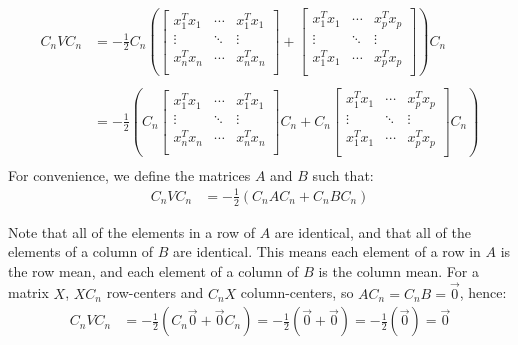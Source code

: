 \documentclass[a4paper]{article}
\begin{document}
\begin{align*}
  C_nVC_n &=-\frac{1}{2} C_n\left(
    \begin{bmatrix}
      x_1^Tx_1 & \cdots & x_1^Tx_1 \\
      \vdots & \ddots & \vdots \\
      x_n^Tx_n & \cdots & x_n^Tx_n\\
    \end{bmatrix}
    + 
    \begin{bmatrix}
      x_1^Tx_1 & \cdots & x_p^Tx_p \\
      \vdots & \ddots & \vdots \\
      x_1^Tx_1 & \cdots & x_p^Tx_p\\
    \end{bmatrix}
  \right)C_n\\\\
  &=-\frac{1}{2} \left(
    C_n
    \begin{bmatrix}
      x_1^Tx_1 & \cdots & x_1^Tx_1 \\
      \vdots & \ddots & \vdots \\
      x_n^Tx_n & \cdots & x_n^Tx_n\\
    \end{bmatrix}C_n
    + 
    C_n \begin{bmatrix}
      x_1^Tx_1 & \cdots & x_p^Tx_p \\
      \vdots & \ddots & \vdots \\
      x_1^Tx_1 & \cdots & x_p^Tx_p\\
    \end{bmatrix}C_n
  \right)\\
\end{align*}
For convenience, we define the matrices $A$ and $B$ such that:
\begin{align*}
  C_nVC_n &= -\frac{1}{2}\left(C_nAC_n + C_nBC_n\right)
\end{align*}

Note that all of the elements in a row of $A$ are identical, and that all of the 
elements of a column of $B$ are identical.  This means each element of a row in $A$
is the row mean, and each element of a column of $B$ is the column mean.
For a matrix $X$, $XC_n$ row-centers and $C_nX$ column-centers, so
$AC_n = C_nB = \vec{0}$, hence:
\begin{align*}
  C_nVC_n &= -\frac{1}{2}\left(C_n\vec{0} + \vec{0}C_n\right) 
  = -\frac{1}{2}\left(\vec{0} + \vec{0}\right) = -\frac{1}{2}\left(\vec{0}\right) = \vec{0}
\end{align*}
\end{document}
